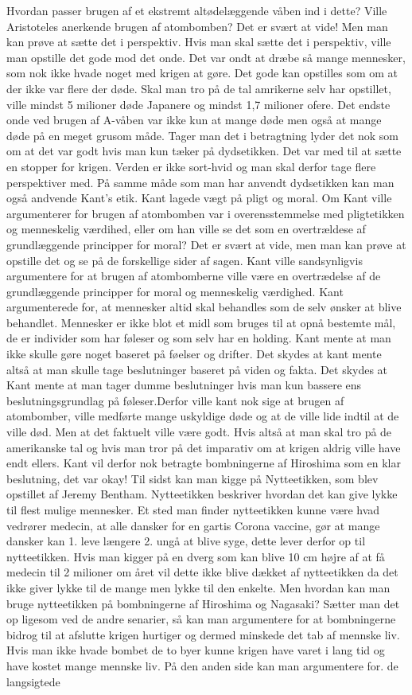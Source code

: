 Hvordan passer brugen af et ekstremt altødelæggende våben ind i dette? Ville Aristoteles anerkende brugen af atombomben? Det er svært at vide! Men man kan prøve at sætte det i perspektiv. Hvis man skal sætte det i perspektiv, ville man opstille det gode mod det onde. Det var ondt at dræbe så mange mennesker, som nok ikke hvade noget med krigen at gøre. Det gode kan opstilles som om at der ikke var flere der døde. Skal man tro på de tal amrikerne selv har opstillet, ville mindst 5 milioner døde Japanere og mindst 1,7 milioner ofere. Det endste onde ved brugen af A-våben var ikke kun at mange døde men også at mange døde på en meget grusom måde. Tager man det i betragtning lyder det nok som om at det var godt hvis man kun tæker på dydsetikken. Det var med til at sætte en stopper for krigen. Verden er ikke sort-hvid og man skal derfor tage flere perspektiver med. På samme måde som man har anvendt dydsetikken kan man også andvende Kant's etik. Kant lagede vægt på pligt og moral. Om Kant ville argumenterer for brugen af atombomben var i overensstemmelse med pligtetikken og menneskelig værdihed, eller om han ville se det som en overtrældese af grundlæggende principper for moral? Det er svært at vide, men man kan prøve at opstille det og se på de forskellige sider af sagen. Kant ville sandsynligvis argumentere for at brugen af atombomberne ville være en overtrædelse af de grundlæggende principper for moral og menneskelig værdighed. Kant argumenterede for, at mennesker altid skal behandles som de selv ønsker at blive behandlet.  Mennesker er ikke blot et midl som bruges til at opnå bestemte mål, de er individer som har føleser og som selv har en holding. Kant mente at man ikke skulle gøre noget baseret på føelser og drifter. Det skydes at  kant mente altså at man skulle tage beslutninger baseret på viden og fakta. Det skydes at Kant mente at man tager dumme beslutninger hvis man kun bassere ens beslutningsgrundlag på føleser.Derfor ville kant nok sige at brugen af atombomber, ville medførte mange uskyldige døde og at de ville lide indtil at de ville død. Men at det faktuelt ville være godt. Hvis altså at man skal tro på de amerikanske tal og hvis man tror på det imparativ om at krigen aldrig ville have endt ellers. Kant vil derfor nok betragte bombningerne af Hiroshima som en klar beslutning, det var okay! Til sidst kan man kigge på Nytteetikken, som blev opstillet af Jeremy Bentham. Nytteetikken beskriver hvordan det kan give lykke til flest mulige mennesker. Et sted man finder nytteetikken kunne være hvad vedrører medecin, at alle dansker for en gartis Corona vaccine, gør at mange dansker kan 1. leve længere 2. ungå at blive syge, dette lever derfor op til nytteetikken. Hvis man kigger på en dverg som kan blive 10 cm højre af at få medecin til 2 milioner om året vil dette ikke blive dækket af nytteetikken da det ikke giver lykke til de mange men lykke til den enkelte. Men hvordan kan man bruge nytteetikken på bombningerne af Hiroshima og Nagasaki? Sætter man det op ligesom ved de andre senarier, så kan man argumentere for at bombningerne bidrog til at afslutte krigen hurtiger og dermed minskede det tab af mennske liv. Hvis man ikke hvade bombet de to byer kunne krigen have varet i lang tid og have kostet mange mennske liv. På den anden side kan man argumentere for. de langsigtede 